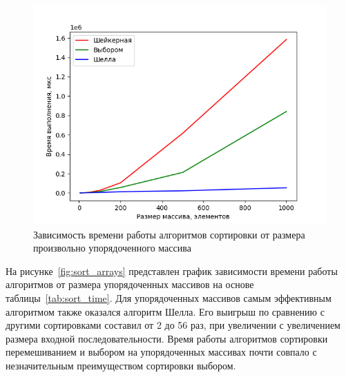 \documentclass[12pt]{report}
\begin{document}
    \begin{figure}[H]
        \centering
        \includegraphics[width=0.9\linewidth]{img/rand_arrays}
        \caption{Зависимость времени работы алгоритмов сортировки от размера произвольно упорядоченного массива}
        \label{fig:random_arrays}
    \end{figure}

    На рисунке~\ref{fig:sort_arrays} представлен график зависимости времени работы алгоритмов
    от размера упорядоченных массивов на основе таблицы~\ref{tab:sort_time}.
    Для упорядоченных массивов самым эффективным алгоритмом также оказался алгоритм Шелла.
    Его выигрыш по сравнению с другими сортировками составил от 2 до 56 раз,
    при увеличении с увеличением размера входной последовательности.
    Время работы алгоритмов сортировки перемешиванием и выбором на упорядоченных массивах
    почти совпало с незначительным преимуществом сортировки выбором.
\end{document}
